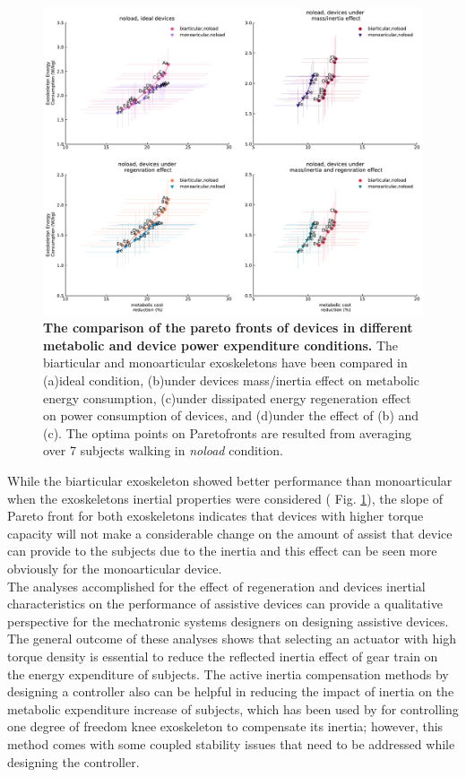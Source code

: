 \documentclass[10pt,letterpaper]{article}
\begin{document}
\begin{figure}[ht]   
	\centering
	\includegraphics[width=\linewidth]{Pareto_Mass_Regenration_Figures/PaperFigure_AddingMass_Pareto.pdf}
	\vspace{1mm}
	\caption{{\small\textbf{The comparison of the pareto fronts of devices in different metabolic and device power expenditure conditions.} The biarticular and monoarticular exoskeletons have been compared in (a)ideal condition, (b)under devices mass/inertia effect on metabolic energy consumption, (c)under dissipated energy regeneration effect on power consumption of devices, and (d)under the effect of (b) and (c). The optima points on Paretofronts are resulted from averaging over 7 subjects walking in {\it noload} condition.}}
	\label{Fig_Paretofronts_Mass_Regeneration_Effect}
\end{figure}
While the biarticular exoskeleton showed better performance than monoarticular when the exoskeletons inertial properties were considered ( Fig. \ref{Fig_Paretofronts_Mass_Regeneration_Effect}), the slope of Pareto front for both exoskeletons indicates that devices with higher torque capacity will not make a considerable change on the amount of assist that device can provide to the subjects due to the inertia and this effect can be seen more obviously for the monoarticular device.\\
The analyses accomplished for the effect of regeneration and devices inertial characteristics on the performance of assistive devices can provide a qualitative perspective for the mechatronic systems designers on designing assistive devices. The general outcome of these analyses shows that selecting an actuator with high torque density is essential to reduce the reflected inertia effect of gear train on the energy expenditure of subjects. The active inertia compensation methods by designing a controller also can be helpful in reducing the impact of inertia on the metabolic expenditure increase of subjects, which has been used by \cite{148} for controlling one degree of freedom knee exoskeleton to compensate its inertia; however, this method comes with some coupled stability issues \cite{146,147,148} that need to be addressed while designing the controller.\\
\end{document}

